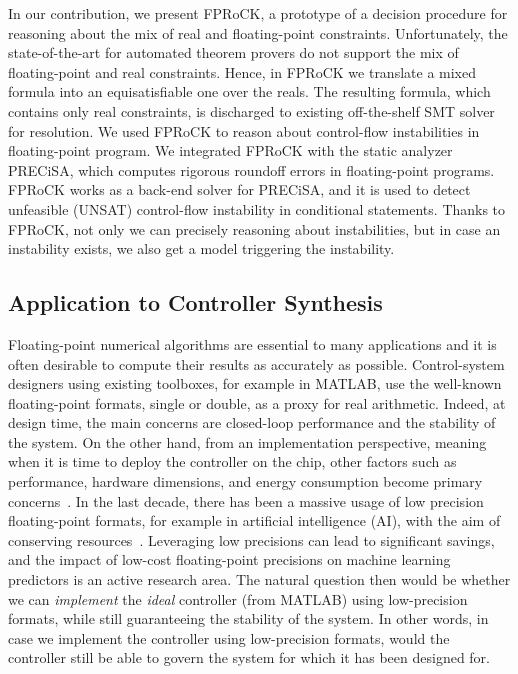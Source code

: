 In our contribution, we present FPRoCK, a prototype of a decision procedure for reasoning about the mix of real and floating-point constraints.
%
Unfortunately, the state-of-the-art for automated theorem provers do not support the mix of floating-point and real constraints.
%
Hence, in FPRoCK we translate a mixed formula into an equisatisfiable one over the reals.
%
The resulting formula, which contains only real constraints, is discharged to existing off-the-shelf SMT solver for resolution.
%
We used FPRoCK to reason about control-flow instabilities in floating-point program. 
%
We integrated FPRoCK with the static analyzer PRECiSA, which computes rigorous roundoff errors in floating-point programs. FPRoCK works as a back-end solver for PRECiSA, and it is used to detect unfeasible (UNSAT) control-flow instability in conditional statements.
%
Thanks to FPRoCK, not only we can precisely reasoning about instabilities, but in case an instability exists, we also get a model triggering the instability.

\subsection{Application to Controller Synthesis}
\label{controllers}
%
Floating-point numerical algorithms are essential to many applications and it is often desirable to compute their results as accurately as possible.
%
Control-system designers using existing toolboxes, for example in MATLAB, use the well-known floating-point formats, single or double, as a proxy for real arithmetic. 
%
Indeed, at design time, the main concerns are closed-loop performance and the stability of the system.
%
%
%
On the other hand, from an implementation perspective, meaning when it is time to deploy the controller on the chip, other factors such as performance, hardware dimensions, and energy consumption become primary concerns~\cite{suardi}.
%
In the last decade, there has been a massive usage of low precision floating-point formats, for example in artificial intelligence (AI), with the aim of conserving resources~\cite{fppower}.
%
Leveraging low precisions can lead to significant savings, and the impact of low-cost floating-point precisions on machine learning predictors is an active research area.
%
The natural question then would be whether we can \emph{implement} the \emph{ideal} controller (from MATLAB) using low-precision formats, while still guaranteeing the stability of the system.
%
In other words, in case we implement the controller using low-precision formats, would the controller still be able to govern the system for which it has been designed for.
%

